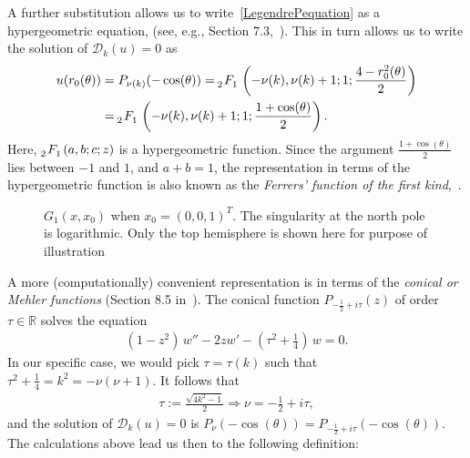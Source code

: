 A further substitution allows us to write~\eqref{LegendrePequation} as
a hypergeometric equation, (see, e.g., Section 7.3,~\cite{lebedev}).
This in turn allows us to write the solution of $\mathcal{D}_k(u)=0$ as 
\begin{align*} 
  u(r_0(\theta)) &= P_{\nu(k)}(-\cos(\theta)) = 
    \tensor[_2]{F}{_1}\left(-\nu(k), \nu(k)+  1; 1; 
      \frac{4-r_0^2(\theta)}{2}\right) \\
    &=\tensor[_2]{F}{_1}\left(-\nu(k), \nu(k)+  1; 1;
    \frac{1+\cos(\theta)}{2}\right).
\end{align*} 
Here, $\tensor[_2]{F}{_1}(a,b;c;z)$ is a hypergeometric function. Since
the argument $\frac{1+\cos(\theta)}{2}$ lies between $-1$ and $1$, and
$a+b = 1$, the representation in terms of the hypergeometric function is
also known as the {\it Ferrers' function of the first
kind},~\cite{fatAbramowitz}. 

\begin{figure}
  \centering
  
  \caption{\label{f:greensFun} $G_1(x,x_0)$ when $x_0=(0,0,1)^T$. The
  singularity at the north pole is logarithmic. Only the top hemisphere
  is shown here for purpose of illustration}
\end{figure}
A more (computationally) convenient representation is in terms of the
{\it conical or Mehler functions} (Section 8.5 in~\cite{lebedev}). The
conical function $P_{-\frac{1}{2}+ i \tau}(z)$ of order $\tau\in
\mathbb{R}$ solves the equation
\begin{align*}
  (1-z^2)\,w'' -2zw' - \left( \tau^2+\frac{1}{4}\right) \,w = 0.
\end{align*}
In our specific case, we would pick $\tau = \tau(k)$ such that
$\tau^2+\frac{1}{4}=k^2 = -\nu(\nu+1).$  It follows that 
\begin{align*}
  \tau:=\frac{\sqrt{4k^2-1}}{2} \Rightarrow  \nu= -\frac{1}{2}+i\tau, 
\end{align*}
and the solution of $\mathcal{D}_k(u)=0$ is $
  P_{\nu} (-\cos(\theta)) = P_{-\frac{1}{2} + i \tau} 
    (-\cos(\theta)).$
The calculations above lead us then to the following definition:

